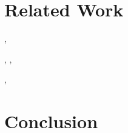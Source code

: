 \documentclass[conference, 10pt]{IEEEtran}
\begin{document}
\label{sec:experiments}

\section{Related Work}
\label{sec:related-work}

\cite{ref:ptl-sim}, \cite{ref:simple-scalar}



\cite{ref:ramp}

\cite{ref:ocelot-pact}

\cite{ref:pdes}, \cite{ref:multi-threaded-sim},
\cite{ref:cuda-simulation-of-many-core}

\cite{ref:verilog-cuda}, \cite{ref:bluespec} 

\cite{ref:lynx}


\section{Conclusion}
\label{sec:conclusion}




\end{document}
